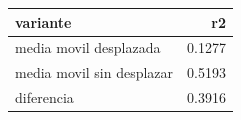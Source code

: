 \begin{tabular}{lr}
\toprule
variante & r2 \\
\midrule
media movil desplazada & 0.1277 \\
media movil sin desplazar & 0.5193 \\
diferencia & 0.3916 \\
\bottomrule
\end{tabular}
